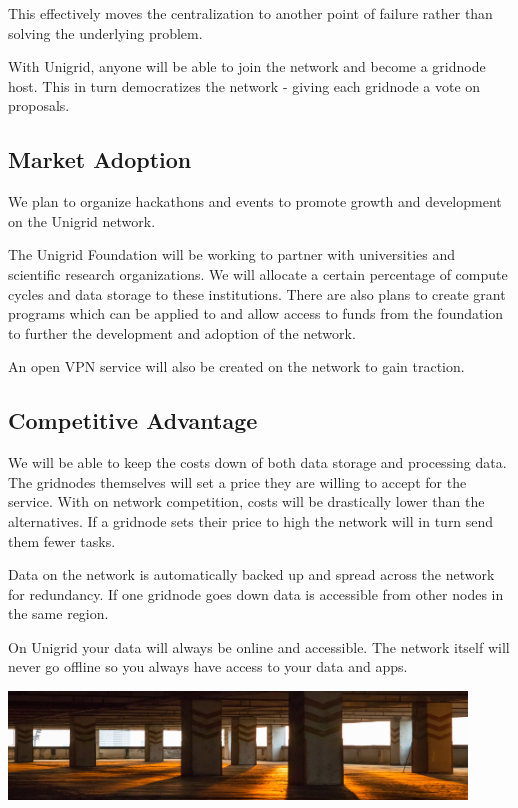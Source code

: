 \documentclass{article}
\begin{document}
This effectively moves the centralization to another point of failure rather than solving the underlying problem.

With Unigrid, anyone will be able to join the network and become a gridnode host. This in turn democratizes the network - giving each gridnode a vote on proposals.

\subsection{Market Adoption}
We plan to organize hackathons and events to promote growth and development on the Unigrid network. 

The Unigrid Foundation will be working to partner with universities and scientific research organizations. We will allocate a certain percentage of compute cycles and data storage to these institutions. There are also plans to create grant programs which can be applied to and allow access to funds from the foundation to further the development and adoption of the network.

An open VPN service will also be created on the network to gain traction.

\subsection{Competitive Advantage}
We will be able to keep the costs down of both data storage and processing data. The gridnodes themselves will set a price they are willing to accept for the service. With on network competition, costs will be drastically lower than the alternatives. If a gridnode sets their price to high the network will in turn send them fewer tasks.

Data on the network is automatically backed up and spread across the network for redundancy. If one gridnode goes down data is accessible from other nodes in the same region.

On Unigrid your data will always be online and accessible. The network itself will never go offline so you always have access to your data and apps.

\begin{mdframed}[style=textimage]
	\includegraphics[width=345pt]{foundation}
\end{mdframed}
\end{document}
